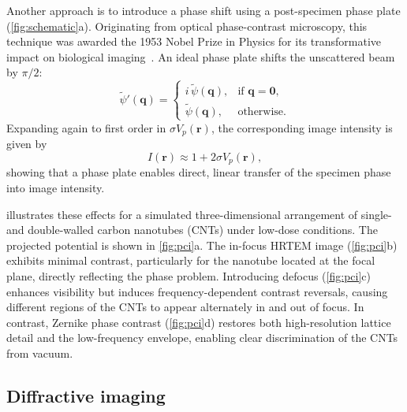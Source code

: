 \documentclass[pdflatex,sn-aps,iicol]{sn-jnl}%
\begin{document}
Another approach is to introduce a phase shift using a post-specimen phase plate (\cref{fig:schematic}a).
Originating from optical phase-contrast microscopy, this technique was awarded the 1953 Nobel Prize in Physics for its transformative impact on biological imaging~\cite{Zernike_1942}.
An ideal phase plate shifts the unscattered beam by $\pi/2$:
\begin{equation}
  \tilde{\psi}'(\boldsymbol{q}) = \begin{cases} i\,\tilde{\psi}(\boldsymbol{q}), & \text{if } \boldsymbol{q}=\boldsymbol{0}, \\ \tilde{\psi}(\boldsymbol{q}), & \text{otherwise}. \end{cases}
  \label{eq:zernike}
\end{equation}
Expanding again to first order in $\sigma V_p(\boldsymbol{r})$, the corresponding image intensity is given by
\begin{equation}
  I(\boldsymbol{r}) \approx 1 + 2\sigma V_p(\boldsymbol{r}),
  \label{eq:zernike-int}
\end{equation}
showing that a phase plate enables direct, linear transfer of the specimen phase into image intensity.

 illustrates these effects for a simulated three-dimensional arrangement of single- and double-walled carbon nanotubes (CNTs) under low-dose conditions.
The projected potential is shown in \cref{fig:pci}a.
The in-focus HRTEM image (\cref{fig:pci}b) exhibits minimal contrast, particularly for the nanotube located at the focal plane, directly reflecting the phase problem.
Introducing defocus (\cref{fig:pci}c) enhances visibility but induces frequency-dependent contrast reversals, causing different regions of the CNTs to appear alternately in and out of focus.
In contrast, Zernike phase contrast (\cref{fig:pci}d) restores both high-resolution lattice detail and the low-frequency envelope, enabling clear discrimination of the CNTs from vacuum.

\subsection*{Diffractive imaging}
\end{document}
